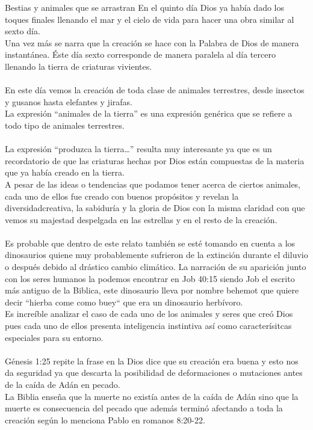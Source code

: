 \begin{section}{Bestias y animales que se arrastran}
	En el quinto día Dios ya había dado los toques finales llenando el mar y el cielo de vida para hacer una obra similar al sexto día.\\
	Una vez más se narra que la creación se hace con la Palabra de Dios de manera instantánea. Éste día sexto corresponde de manera paralela al día tercero llenando la tierra de criaturas vivientes.\\
	\\
	En este día vemos la creación de toda clase de animales terrestres, desde insectos y gusanos hasta elefantes y jirafas.\\
	La expresión ``animales de la tierra'' es una expresión genérica que se refiere a todo tipo de animales terrestres.\\
	\\
	La expresión ``produzca la tierra\ldots'' resulta muy interesante ya que es un recordatorio de que las criaturas hechas por Dios están compuestas de la materia que ya había creado en la tierra.\\
	A pesar de las ideas o tendencias que podamos tener acerca de ciertos animales, cada uno de ellos fue creado con buenos propósitos y revelan la diversidadcreativa, la sabiduría y la gloria de Dios con la misma claridad con que vemos su majestad despelgada en las estrellas y en el resto de la creación.\\
	\\
	Es probable que dentro de este relato también se esté tomando en cuenta a los dinosaurios quiene muy probablemente sufrieron de la extinción durante el diluvio o después debido al drástico cambio climático. La narración de su aparición junto con los seres humanos la podemos encontrar en Job 40:15 siendo Job el escrito más antiguo de la Biblica, este dinosaurio lleva por nombre behemot que quiere decir ``hierba come como buey`` que era un dinosaurio herbívoro.\\
Es increíble analizar el caso de cada uno de los animales y seres que creó Dios pues cada uno de ellos presenta inteligencia instintiva así como caracterísitcas especiales para su entorno.\\
\\
Génesis 1:25 repite la frase en la Dios dice que su creación era buena y esto nos da seguridad ya que descarta la posibilidad de deformaciones o mutaciones antes de la caída de Adán en pecado.\\
La Biblia enseña que la muerte no existía antes de la caída de Adán sino que la muerte es consecuencia del pecado que además terminó afectando a toda la creación según lo menciona Pablo en romanos 8:20-22.\\

\end{section}
